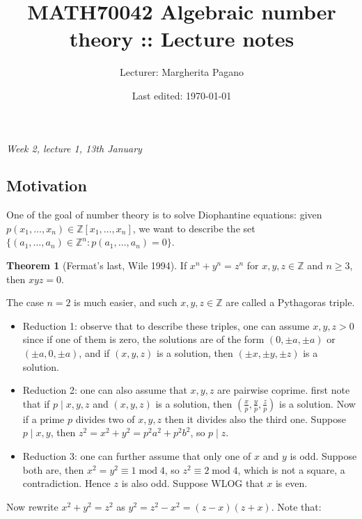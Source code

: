 \documentclass{article}
\title{MATH70042 Algebraic number theory :: Lecture notes}
\author{Lecturer: Margherita Pagano}
\date{Last edited: \today}
\newcommand{\Z}{\mathbb{Z}}
\newcommand{\Mod}{\operatorname{mod}}
\theoremstyle{definition}
\newtheorem{thm}[defn]{Theorem}
\begin{document}
\maketitle
\thispagestyle{empty}

\tableofcontents
\thispagestyle{empty}
\newpage
\setcounter{page}{1}

\begin{flushright}
\textit{Week 2, lecture 1, 13th January}
\end{flushright}

\subsection*{Motivation}
One of the goal of number theory is to solve Diophantine equations: given $p(x_1,\ldots,x_n)\in\Z[x_1,\ldots,x_n]$, we want to describe the set $\{(a_1,\ldots,a_n)\in\Z^n:p(a_1,\ldots,a_n)=0\}$.

\begin{thm}[Fermat's last, Wile 1994]
If $x^n+y^n=z^n$ for $x,y,z\in\Z$ and $n\geq 3$, then $xyz=0$.
\end{thm}

The case $n=2$ is much easier, and such $x,y,z\in\Z$ are called a Pythagoras triple.

\begin{itemize}
\item Reduction 1: observe that to describe these triples, one can assume $x,y,z>0$ since if one of them is zero, the solutions are of the form $(0,\pm a,\pm a)$ or $(\pm a,0,\pm a)$, and if $(x,y,z)$ is a solution, then $(\pm x,\pm y,\pm z)$ is a solution.
\item Reduction 2: one can also assume that $x,y,z$ are pairwise coprime. first note that if $p\mid x,y,z$ and $(x,y,z)$ is a solution, then $\left(\frac{x}{p},\frac{y}{p},\frac{z}{p}\right)$ is a solution. Now if a prime $p$ divides two of $x,y,z$ then it divides also the third one. Suppose $p\mid x,y$, then $z^2=x^2+y^2=p^2a^2+p^2b^2$, so $p\mid z$.
\item Reduction 3: one can further assume that only one of $x$ and $y$ is odd. Suppose both are, then $x^2=y^2\equiv 1\Mod 4$, so $z^2\equiv 2\Mod 4$, which is not a square, a contradiction. Hence $z$ is also odd. Suppose WLOG that $x$ is even.
\end{itemize}

Now rewrite $x^2+y^2=z^2$ as $y^2=z^2-x^2=(z-x)(z+x)$. Note that:
\end{document}
